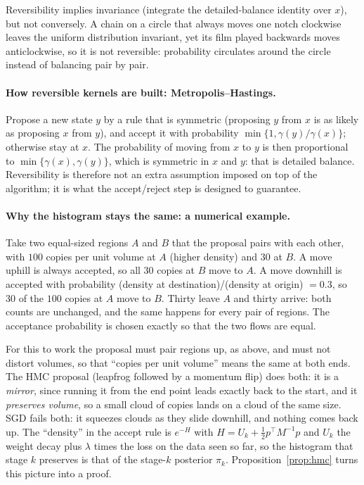 \documentclass[11pt]{article}
\theoremstyle{definition}
\theoremstyle{remark}
\begin{document}
Reversibility implies invariance (integrate the detailed-balance identity over $x$), but not conversely. A chain on a
circle that always moves one notch clockwise leaves the uniform distribution invariant, yet its film played backwards
moves anticlockwise, so it is not reversible: probability circulates around the circle instead of balancing pair by pair.

\paragraph{How reversible kernels are built: Metropolis--Hastings.} Propose a new state $y$ by a rule that is symmetric
(proposing $y$ from $x$ is as likely as proposing $x$ from $y$), and accept it with probability $\min\{1,\gamma(y)/\gamma(x)\}$;
otherwise stay at $x$. The probability of moving from $x$ to $y$ is then proportional to $\min\{\gamma(x),\gamma(y)\}$, which
is symmetric in $x$ and $y$: that is detailed balance. Reversibility is therefore not an extra assumption imposed on top
of the algorithm; it is what the accept/reject step is designed to guarantee.

\paragraph{Why the histogram stays the same: a numerical example.} Take two equal-sized regions $A$ and $B$ that the
proposal pairs with each other, with $100$ copies per unit volume at $A$ (higher density) and $30$ at $B$. A move uphill is
always accepted, so all $30$ copies at $B$ move to $A$. A move downhill is accepted with probability
(density at destination)/(density at origin) $=0.3$, so $30$ of the $100$ copies at $A$ move to $B$. Thirty leave $A$ and
thirty arrive: both counts are unchanged, and the same happens for every pair of regions. The acceptance probability is
chosen exactly so that the two flows are equal.

For this to work the proposal must pair regions up, as above, and must not distort volumes, so that ``copies per unit
volume'' means the same at both ends. The HMC proposal (leapfrog followed by a momentum flip) does both: it is a
\emph{mirror}, since running it from the end point leads exactly back to the start, and it \emph{preserves volume}, so a
small cloud of copies lands on a cloud of the same size. SGD fails both: it squeezes clouds as they slide downhill, and
nothing comes back up. The ``density'' in the accept rule is $e^{-H}$ with $H=U_k+\frac12p^\top M^{-1}p$ and $U_k$ the
weight decay plus $\lambda$ times the loss on the data seen so far, so the histogram that stage $k$ preserves is that of the
stage-$k$ posterior $\pi_k$. Proposition~\ref{prop:hmc} turns this picture into a proof.
\end{document}
